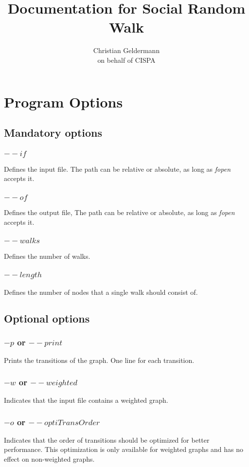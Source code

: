 \documentclass[12pt,a4paper]{article}
\title{Documentation for Social Random Walk}
\author{Christian Geldermann\\on behalf of CISPA}
\begin{document}
\maketitle
\section{Program Options}
	\subsection{Mandatory options}
		\subsubsection{$--if$}
			Defines the input file. The path can be relative or absolute, as long as \textit{fopen} accepts it.
		\subsubsection{$--of$}
			Defines the output file, The path can be relative or absolute, as long as \textit{fopen} accepts it.
		\subsubsection{$--walks$}
			Defines the number of walks.
		\subsubsection{$--length$}
			Defines the number of nodes that a single walk should consist of.
	\subsection{Optional options}
		\subsubsection{$-p$ or $--print$}
			Prints the transitions of the graph. One line for each transition.
		\subsubsection{$-w$ or $--weighted$}
			Indicates that the input file contains a weighted graph.
		\subsubsection{$-o$ or $--optiTransOrder$}
			Indicates that the order of transitions should be optimized for better performance. This optimization is only available for weighted graphs and has no effect on non-weighted graphs.
			
\end{document}
